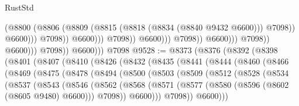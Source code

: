 \begin{lexlean}{RustStd}
\begin{coremodule}
                                                        (@8800
                                                          (@8806
                                                            (@8809
                                                              (@8815
                                                                (@8818 (@8834 (@8840 @9432 @6600)))
                                                                @7098))
                                                            @6600)))
                                                      @7098))
                                                  @6600)))
                                            @7098))
                                        @6600)))
                                  @7098))
                              @6600)))
                        @7098))
                    @6600)))
              @7098))
          @6600)))
    @7098
@9528 := @8373
    (@8376
      (@8392
        (@8398
          (@8401
            (@8407
              (@8410
                (@8426
                  (@8432
                    (@8435
                      (@8441
                        (@8444
                          (@8460
                            (@8466
                              (@8469
                                (@8475
                                  (@8478
                                    (@8494
                                      (@8500
                                        (@8503
                                          (@8509
                                            (@8512
                                              (@8528
                                                (@8534
                                                  (@8537
                                                    (@8543
                                                      (@8546
                                                        (@8562
                                                          (@8568
                                                            (@8571
                                                              (@8577
                                                                (@8580
                                                                  (@8596
                                                                    (@8602 (@8605 @9480) @6600)))
                                                                @7098))
                                                            @6600)))
                                                      @7098))
                                                  @6600)))

\end{coremodule}
\end{lexlean}
